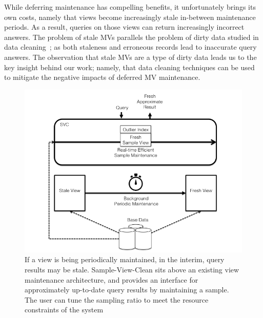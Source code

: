 While deferring maintenance has compelling benefits, it unfortunately brings its own costs, namely that views become increasingly stale in-between maintenance periods. As a result, queries on those views can return increasingly incorrect answers.
The problem of stale MVs parallels the problem of dirty data studied in data cleaning~\cite{rahm2000data}; as both staleness and erroneous records lead to inaccurate query answers.
The observation that stale MVs are a type of dirty data leads us to the key insight behind our work; namely, that data cleaning techniques can be used to mitigate the negative impacts
of deferred MV maintenance.

\begin{figure}[t] \vspace{-2em}
\centering
 \includegraphics[scale=0.30]{figs/sys-arch.png} \vspace{-.25em}
 \caption{If a view is being periodically maintained, in the interim, query results may be stale. Sample-View-Clean sits above an existing view maintenance architecture, and provides an interface for approximately up-to-date query results by maintaining a sample. The user can tune the sampling ratio to meet the resource constraints of the system \label{sys-arch}}\vspace{-1.75em}
\end{figure}

